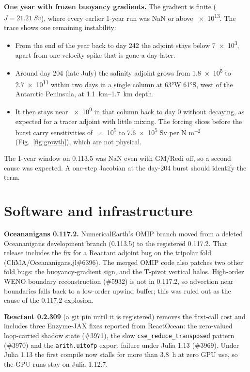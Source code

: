 \documentclass[10pt]{article}
\begin{document}
\textbf{One year with frozen buoyancy gradients.} The gradient is finite ($J = \SI{21.21}{Sv}$), where every earlier
1-year run was NaN or above \num{e13}. The trace shows one remaining instability:
\begin{itemize}
  \item From the end of the year back to day 242 the adjoint stays below \num{7e3}, apart from one velocity spike that
        is gone a day later.
  \item Around day 204 (late July) the salinity adjoint grows from \num{1.8e5} to \num{2.7e11} within two days in a single
        column at \ang{63}W \ang{61}S, west of the Antarctic Peninsula, at \SIrange{1.1}{1.7}{km} depth.
  \item It then stays near \num{e9} in that column back to day 0 without decaying, as expected for a tracer adjoint
        with little mixing. The forcing slices before the burst carry sensitivities of \num{e5} to \num{7.6e5} Sv per N
        m$^{-2}$ (Fig.~\ref{fig:growth}), which are not physical.
\end{itemize}
The 1-year window on 0.113.5 was NaN even with GM/Redi off, so a second cause was expected. A one-step Jacobian at
the day-204 burst should identify the term.

\section{Software and infrastructure}

\textbf{Oceananigans 0.117.2.} NumericalEarth's OMIP branch moved from a deleted Oceananigans development branch
(0.113.5) to the registered 0.117.2. That release includes the fix for a Reactant adjoint bug on the tripolar fold
(CliMA/Oceananigans.jl\#6396). The merged OMIP code also patches two other fold bugs: the buoyancy-gradient sign, and
the T-pivot vertical halos. High-order WENO boundary reconstruction (\#5932) is not in 0.117.2, so advection near
boundaries falls back to a low-order upwind buffer; this was ruled out as the cause of the 0.117.2 explosion.

\textbf{Reactant 0.2.309} (a git pin until it is registered) removes the first-call cost and includes three
Enzyme-JAX fixes reported from ReactOcean: the zero-valued loop-carried shadow state (\#3971), the slow
\texttt{cse\_reduce\_transposed} pattern (\#3970) and the \texttt{arith.uitofp} export failure under Julia 1.13 (\#3969).
Under Julia 1.13 the first compile now stalls for more than \SI{3.8}{h} at zero GPU use, so the GPU runs stay on
Julia 1.12.7.
\end{document}
